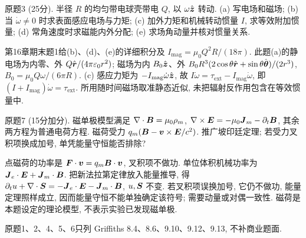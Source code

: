 \begin{exercise}
原题3 (25分). 半径 $R$ 的均匀带电球壳带电 $Q$, 以 $\omega\hat{\boldsymbol{z}}$ 转动. (a) 写电场和磁场; (b) 当 $\dot\omega\ne0$ 时求表面感应电场与力矩; (c) 加外力矩和机械转动惯量 $I$, 求等效附加惯量; (d) 常角速度时求磁能内外分配; (e) 求场角动量并核对惯量关系.
\end{exercise}
\begin{solution}
第16章期末题1给(b)、(d)、(e)的详细积分及 $I_\mathrm{mag}=\mu_0Q^2R/(18\pi)$. 此题(a)的静电场为内零、外 $Q\hat{\boldsymbol{r}}/(4\pi\varepsilon_0 r^2)$; 磁场为内 $B_0\hat{\boldsymbol{z}}$、外 $B_0R^3(2\cos\theta\hat{\boldsymbol{r}}+\sin\theta\hat{\boldsymbol{\theta}})/(2r^3)$, $B_0=\mu_0Q\omega/(6\pi R)$. (c) 感应力矩为 $-I_\mathrm{mag}\dot\omega\hat{\boldsymbol{z}}$, 故 $I\dot\omega=\tau_\mathrm{ext}-I_\mathrm{mag}\dot\omega$, 即 $(I+I_\mathrm{mag})\dot\omega=\tau_\mathrm{ext}$. 所用随时间磁场取准静态近似, 未把辐射反作用包含在等效惯量中.
\end{solution}
\begin{exercise}
原题7 (15分加分). 磁单极模型满足 $\nabla\cdot\boldsymbol{B}=\mu_0\rho_m$, $\nabla\times\boldsymbol{E}=-\mu_0\boldsymbol{J}_m-\partial_t\boldsymbol{B}$, 其余两方程为普通电荷方程. 磁荷受力 $q_m(\boldsymbol{B}-\boldsymbol{v}\times\boldsymbol{E}/c^2)$. 推广坡印廷定理; 若受力叉积项换成加号, 单凭能量守恒能否排除?
\end{exercise}
\begin{solution}
点磁荷的功率是 $\boldsymbol{F}\cdot\boldsymbol{v}=q_m\boldsymbol{B}\cdot\boldsymbol{v}$, 叉积项不做功. 单位体积机械功率为 $\boldsymbol{J}_e\cdot\boldsymbol{E}+\boldsymbol{J}_m\cdot\boldsymbol{B}$. 把新法拉第定律放入能量推导, 得
$\partial_tu+\nabla\cdot\boldsymbol{S}=-\boldsymbol{J}_e\cdot\boldsymbol{E}-\boldsymbol{J}_m\cdot\boldsymbol{B}$, $u,\boldsymbol{S}$ 不变. 若叉积项误换加号, 它仍不做功, 能量定理照样成立, 因而能量守恒不能单独确定该符号; 需要动量或对偶一致性. 磁荷是本题设定的理论模型, 不表示实验已发现磁单极.
\end{solution}
原题1、2、4、5、6只列 Griffiths 8.4、8.6、9.10、9.12、9.13, 不补商业题面.
